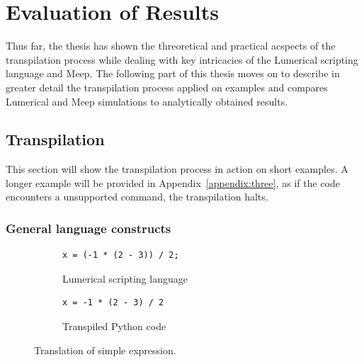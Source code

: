 \chapter{Evaluation of Results}\label{chap:results}
Thus far, the thesis has shown the threoretical and practical acspects of the transpilation process while dealing with key intricacies of the Lumerical scripting language and Meep. The following part of this thesis moves on to describe in greater detail the transpilation process applied on examples and compares Lumerical and Meep simulations to analytically obtained results.
\section{Transpilation}
This section will show the transpilation process in action on short examples. A longer example will be provided in Appendix~\ref{appendix:three}, as if the code encounters a unsupported command, the transpilation halts.

\subsection{General language constructs}
\begin{figure}[H]\label{fig:lumerical-pyhton-expression}
  \centering

  \begin{subfigure}[t]{0.4\textwidth}
    \begin{lstlisting}[style=lumerical]
x = (-1 * (2 - 3)) / 2;
    \end{lstlisting}
    \caption{Lumerical scripting language}
  \end{subfigure}
  \hfill
  \begin{subfigure}[t]{0.4\textwidth}
    \begin{lstlisting}[style=python]
x = -1 * (2 - 3) / 2
    \end{lstlisting}
    \caption{Transpiled Python code}
  \end{subfigure}

  \caption{Translation of simple expression.}
  
\end{figure}





